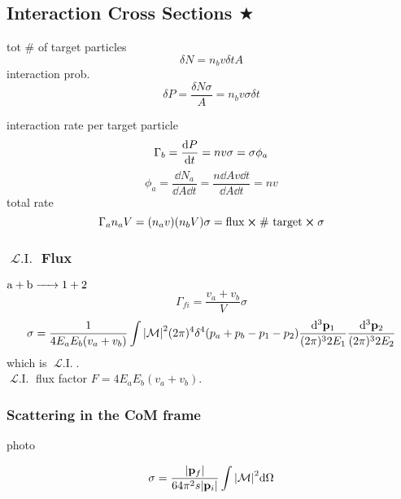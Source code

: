 \documentclass[a4paper]{article}
\DeclareMathOperator{\LI}{\mathscr{L}.I.}
\numberwithin{equation}{section}
\begin{document}
\subsection{Interaction Cross Sections $ \bigstar $}
tot \# of target particles
\begin{equation}\label{key}
\delta N = n_b v\delta t A
\end{equation}
interaction prob.
\begin{equation}\label{key}
\delta P = \dfrac{\delta N \sigma}{A} = n_b v \sigma \delta t
\end{equation}

interaction rate per target particle
\begin{equation}\label{key}
\Gamma_b =  \dv{P}{t} = n v \sigma = \sigma \phi_a
\end{equation}
\begin{equation}\label{key}
\phi_a = \dfrac{\dd N_a}{\dd A \dd t} = \dfrac{n\dd A v\dd t}{\dd A\dd t} = n v
\end{equation}
total rate
\begin{equation}\label{key}
\Gamma_a n_a V = (n_a v) (n_b V) \sigma = \text{flux}\cross\text{\# target}\cross\sigma
\end{equation}

\subsubsection{$ \LI $ Flux}
$ \ce{a + b -> 1 + 2} $
\begin{equation}\label{key}
\Gamma_{fi} = \dfrac{v_a + v_b}{V}\sigma
\end{equation}
\begin{equation}\label{key}
\sigma = \dfrac{1}{4E_aE_b(v_a + v_b)} \int \abs{\mathcal{M}}^2 (2\pi)^4 \delta^4(p_a + p_b- p_1 - p_2) \dfrac{\dd[3]\vb{p}_1}{(2\pi)^3 2E_1} \dfrac{\dd[3]\vb{p}_2}{(2\pi)^3 2E_2}
\end{equation}
which is $ \LI $.\\
$ \LI $ flux factor $ F = 4E_aE_b(v_a + v_b) $.

\subsubsection{Scattering in the CoM frame}
photo

\begin{equation}\label{key}
\sigma = \dfrac{\abs{\vb{p}_f}}{64\pi^2 s\abs{\vb{p}_i}} \int \abs{\mathcal{M}}^2 \dd\Omega
\end{equation}
\end{document}
